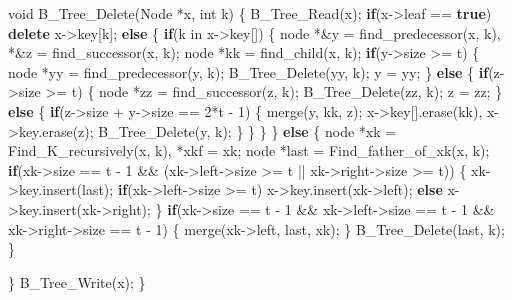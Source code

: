 \documentclass[]{article}
\newenvironment{Shaded}{}{}
\newcommand{\ControlFlowTok}[1]{\textcolor[rgb]{0.00,0.44,0.13}{\textbf{#1}}}
\newcommand{\DataTypeTok}[1]{\textcolor[rgb]{0.56,0.13,0.00}{#1}}
\newcommand{\DecValTok}[1]{\textcolor[rgb]{0.25,0.63,0.44}{#1}}
\newcommand{\KeywordTok}[1]{\textcolor[rgb]{0.00,0.44,0.13}{\textbf{#1}}}
\newcommand{\NormalTok}[1]{#1}
\begin{document}
\begin{Shaded}
\begin{Highlighting}[]
\DataTypeTok{void}\NormalTok{ B_Tree_Delete(Node *x, }\DataTypeTok{int}\NormalTok{ k) \{}
\NormalTok{    B_Tree_Read(x);}
    \ControlFlowTok{if}\NormalTok{(x->leaf == }\KeywordTok{true}\NormalTok{) }
        \KeywordTok{delete}\NormalTok{ x->key[k];}
    \ControlFlowTok{else}\NormalTok{ \{}
        \ControlFlowTok{if}\NormalTok{(k in x->key[]) \{}
\NormalTok{            node *&y = find_predecessor(x, k), *&z = find_successor(x, k);}
\NormalTok{            node *kk = find_child(x, k);}
            \ControlFlowTok{if}\NormalTok{(y->size >= t) \{}
\NormalTok{                node *yy = find_predecessor(y, k);}
\NormalTok{                B_Tree_Delete(yy, k);}
\NormalTok{                y = yy;}
\NormalTok{            \}}
            \ControlFlowTok{else}\NormalTok{ \{}
                \ControlFlowTok{if}\NormalTok{(z->size >= t) \{}
\NormalTok{                    node *zz = find_successor(z, k);}
\NormalTok{                    B_Tree_Delete(zz, k);}
\NormalTok{                    z = zz;}
\NormalTok{                \}}
                \ControlFlowTok{else}\NormalTok{ \{}
                    \ControlFlowTok{if}\NormalTok{(z->size + y->size == }\DecValTok{2}\NormalTok{*t - }\DecValTok{1}\NormalTok{) \{}
\NormalTok{                        merge(y, kk, z);}
\NormalTok{                        x->key[].erase(kk), x->key.erase(z);}
\NormalTok{                        B_Tree_Delete(y, k);}
\NormalTok{                    \}}
\NormalTok{                \}}
\NormalTok{            \}}
\NormalTok{        \}}
        \ControlFlowTok{else}\NormalTok{ \{}
\NormalTok{            node *xk = Find_K_recursively(x, k), *xkf = xk;}
\NormalTok{            node *last = Find_father_of_xk(x, k);}
            \ControlFlowTok{if}\NormalTok{(xk->size == t - }\DecValTok{1}\NormalTok{ && (xk->left->size >= t || xk->right->size >= t)) \{}
\NormalTok{                xk->key.insert(last);}
                \ControlFlowTok{if}\NormalTok{(xk->left->size >= t) x->key.insert(xk->left);}
                \ControlFlowTok{else}\NormalTok{ x->key.insert(xk->right);}
\NormalTok{            \}}
            \ControlFlowTok{if}\NormalTok{(xk->size == t - }\DecValTok{1}\NormalTok{ && xk->left->size == t - }\DecValTok{1}\NormalTok{ && xk->right->size == t - }\DecValTok{1}\NormalTok{) \{}
\NormalTok{                merge(xk->left, last, xk);}
\NormalTok{            \}}
\NormalTok{            B_Tree_Delete(last, k);}
\NormalTok{        \}}
        
\NormalTok{    \}}
\NormalTok{    B_Tree_Write(x);}
\NormalTok{\}}
\end{Highlighting}
\end{Shaded}
\end{document}
